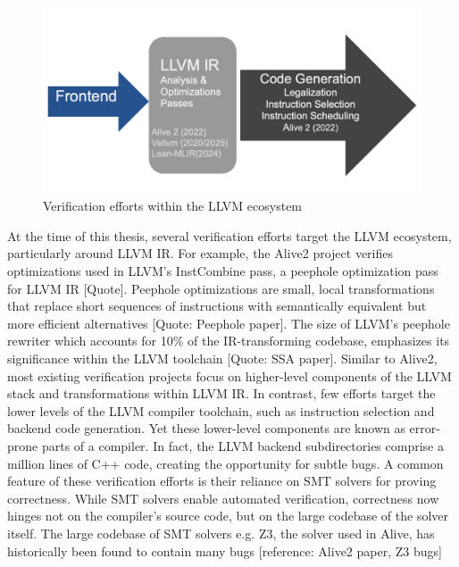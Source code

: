 \begin{figure}[htbp]
  \centering
  \includegraphics[scale=0.35]{thesis/verification_efforts_intro.png}
  \caption{Verification efforts within the LLVM ecosystem}
  \label{fig:your-label}
\end{figure}

At the time of this thesis, several verification efforts target the LLVM ecosystem, particularly around LLVM IR. For example, the Alive2 project verifies optimizations used in LLVM’s InstCombine pass, a peephole optimization pass for LLVM IR [Quote]. Peephole optimizations are small, local transformations that replace short sequences of instructions with semantically equivalent but more efficient alternatives [Quote: Peephole paper]. The size of LLVM's peephole rewriter which accounts  for  10\% of the IR-transforming codebase, emphasizes its significance within the LLVM toolchain [Quote: SSA paper].
Similar to Alive2, most existing verification projects focus on higher-level components of the LLVM stack and transformations within LLVM IR. In contrast, few efforts target the lower levels of the LLVM compiler toolchain, such as instruction selection and backend code generation. Yet these lower-level components are known as error-prone parts of a compiler. In fact, the LLVM backend subdirectories comprise a million lines of C++ code, creating the opportunity for subtle bugs. A common feature of these verification efforts is their reliance on SMT solvers for proving correctness. While SMT solvers enable automated verification, correctness now hinges not on the compiler’s source code, but on the large codebase of the solver itself. The large codebase of SMT solvers e.g. Z3, the solver used in Alive, has historically been found to contain many bugs [reference: Alive2 paper, Z3 bugs]

